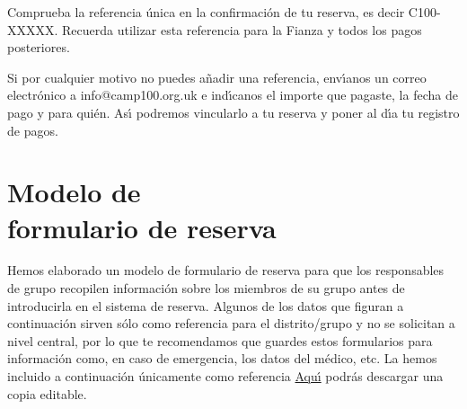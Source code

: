\documentclass[a4paper, 11pt]{report}
\begin{document}
Comprueba la referencia \'unica en la confirmaci\'on de tu reserva, es decir C100-XXXXX. Recuerda utilizar esta referencia para la Fianza y todos los pagos posteriores. 

Si por cualquier motivo no puedes a\~nadir una referencia, env\'{\i}anos un correo electr\'onico a info@camp100.org.uk e ind\'{\i}canos el importe que pagaste, la fecha de pago y para qui\'en. As\'{\i} podremos vincularlo a tu reserva y poner al d\'{\i}a tu registro de pagos.



\chapter[Modelo de formulario de reserva]{Modelo de\\ formulario de reserva}
\label{chap:template-booking-form}

Hemos elaborado un modelo de formulario de reserva para que los responsables de grupo recopilen informaci\'on sobre los miembros de su grupo antes de introducirla en el sistema de reserva.
Algunos de los datos que figuran a continuaci\'on sirven s\'olo como referencia para el distrito/grupo y no se solicitan a nivel central, por lo que te recomendamos que guardes estos formularios para informaci\'on como, en caso de emergencia, los datos del m\'edico, etc.  La hemos incluido a continuaci\'on \'unicamente como referencia \href{https://drive.google.com/file/d/1oSFIkZQxzes3VTi5ZqPHCcAu4DiscvOm/view}{Aqu\'{\i}} podr\'as descargar una copia editable. 



\makedocumentbackpage
\end{document}
